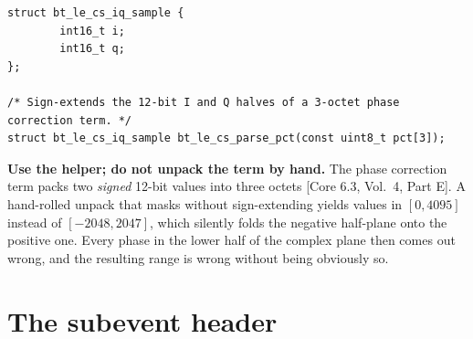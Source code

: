 \documentclass[11pt,a4paper]{article}
\newcommand{\core}[1]{\textcolor{rulegrey}{\small[Core 6.3, #1]}}
\begin{document}
\begin{lstlisting}
struct bt_le_cs_iq_sample {
        int16_t i;
        int16_t q;
};

/* Sign-extends the 12-bit I and Q halves of a 3-octet phase correction term. */
struct bt_le_cs_iq_sample bt_le_cs_parse_pct(const uint8_t pct[3]);
\end{lstlisting}

\begin{callout}
\textbf{Use the helper; do not unpack the term by hand.} The phase correction term packs two
\emph{signed} 12-bit values into three octets \core{Vol.\ 4, Part E}. A hand-rolled unpack that masks
without sign-extending yields values in $[0,4095]$ instead of $[-2048,2047]$, which silently folds
the negative half-plane onto the positive one. Every phase in the lower half of the complex plane
then comes out wrong, and the resulting range is wrong without being obviously so.
\end{callout}

\section{The subevent header}
\label{sec:header}
\end{document}
